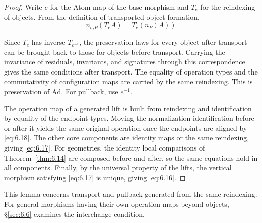 \begin{proof}

Write $e$ for the Atom map of the base morphism and $T_e$ for the reindexing of objects.
From the definition of transported object formation,
\begin{equation*}
n_{\sigma_!P}(T_eA)=T_e(n_P(A))
\tag{6.18}\label{eq:6.18}
\end{equation*}

Since $T_e$ has inverse $T_{e^{-1}}$, the preservation laws for every object
after transport can be brought back to those for objects before transport.
Carrying the invariance of residuals, invariants, and signatures through this
correspondence gives the same conditions after transport.
The equality of operation types and the commutativity of configuration maps are
carried by the same reindexing. This is preservation of $\mathrm{Ad}$.
For pullback, use $e^{-1}$.

The operation map of a generated lift is built from reindexing and identification
by equality of the endpoint types. Moving the normalization identification before
or after it yields the same original operation once the endpoints are aligned by
\eqref{eq:6.18}. The other core components are identity maps or the same reindexing,
giving \eqref{eq:6.17}. For geometries, the identity local comparisons of
Theorem~\ref{thm:6.14} are composed before and after, so the same equations hold
in all components. Finally, by the universal property of the lifts, the vertical
morphism satisfying \eqref{eq:6.17} is unique, giving \eqref{eq:6.16}.

\end{proof}

This lemma concerns transport and pullback generated from the same reindexing.
For general morphisms having their own operation maps beyond objects,
\S\ref{sec:6.6} examines the interchange condition.

